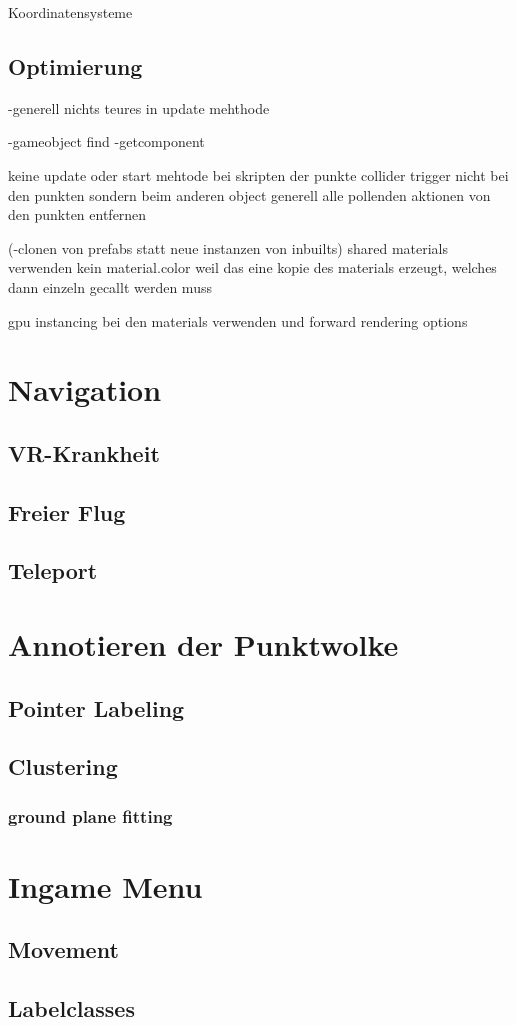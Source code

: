 Koordinatensysteme

\subsection{Optimierung}
-generell nichts teures in update mehthode
	
-gameobject find
-getcomponent

keine update oder start mehtode bei skripten der punkte
collider trigger nicht bei den punkten sondern beim anderen object
generell alle pollenden aktionen von den punkten entfernen


(-clonen von prefabs statt neue instanzen von inbuilts)
shared materials verwenden   kein material.color weil das eine kopie des materials erzeugt, welches dann einzeln gecallt werden muss

gpu instancing bei den materials verwenden und forward rendering options

\section{Navigation}
\label{sec:Navigation}
\subsection{VR-Krankheit}
\subsection{Freier Flug}
\subsection{Teleport}

\section{Annotieren der Punktwolke}
\label{sec:Annotation}
\subsection{Pointer Labeling}
\subsection{Clustering}
\subsubsection{ground plane fitting}

\section{Ingame Menu}
\label{sec:UIMenu}
\subsection{Movement}
\subsection{Labelclasses}



